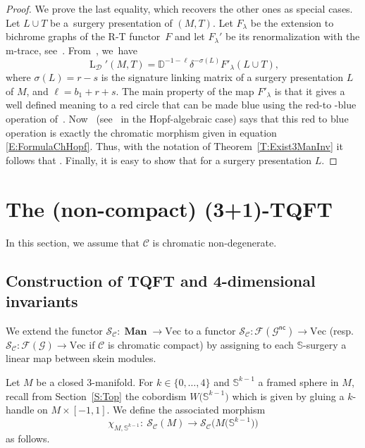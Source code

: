 \documentclass[pdftex]{sigma}
\numberwithin{equation}{section}
\numberwithin{theorem}{section}
\numberwithin{proposition}{section}
\numberwithin{definition}{section}
\numberwithin{lemma}{section}
\numberwithin{corollary}{section}
\numberwithin{remark}{section}
\numberwithin{example}{section}
\newcommand{\cat}{\mathcal{C}}
\newcommand{\catd}{\mathcal{D}}
\newcommand{\TSkein}{{\mathscr{S}}}
\newcommand{\Vect}{\mathrm{Vec}}
\newcommand{\nc}[1]{{#1^{\mathsf{nc}}}}
\newcommand{\man}{\operatorname{\textbf{Man}}}
\newcommand{\Sp}{\mathbb{S}}
\begin{document}
 \begin{proof}
We prove the last equality, which recovers the other ones as special cases. Let ${L\cup T}$ be a~surgery presentation of $(M,T)$. Let $F_\lambda$ be the extension to bichrome graphs of the R-T functor~$F$ and let $F_\lambda'$ be its renormalization with the m-trace, see~\cite{DRGGPMR2022, DRGPM18}. From~\cite[Theorem~3.8]{DRGGPMR2022}, we~have%
\[
\operatorname{L}_\catd'(M,T)= \mathbb{D}^{-1 - \ell} \delta^{- \sigma(L)} F'_{\lambda}(L\cup T),
\]
where $\sigma(L)=r-s$ is the signature linking matrix of a surgery presentation $L$ of $M$,  and $\ell=b_1+r+s$.
The main property of the map $F'_\lambda$ is that it gives a well defined meaning to a red circle that can be made blue using the red-to -blue operation of~\cite{DRGGPMR2022}.
Now~\cite{CGPV2023b} (see~\cite[Lemma 6.3]{CGPT20} in the Hopf-algebraic case) says that this red to blue operation is exactly the chromatic morphism given in equation \eqref{E:FormulaChHopf}. Thus, with the notation of Theorem~\ref{T:Exist3ManInv} it follows that .
Finally, it is easy to show that  for a surgery presentation $L$.
\end{proof}

\section{The (non-compact) (3+1)-TQFT}%
In this section, we assume that $\cat$ is
chromatic non-degenerate.

\subsection{Construction of TQFT and 4-dimensional invariants}
We extend the functor $\TSkein_\cat\colon\man\to \Vect$ to a
functor $\TSkein_\cat\colon \mathcal{F}(\nc{\mathcal{G}})\to \Vect$
(resp.~$\TSkein_\cat\colon \mathcal{F}(\mathcal{G})\to \Vect$ if
$\cat$ is chromatic compact)
by assigning to each $\Sp$-surgery a
linear map between skein modules.

Let $M$ be a closed 3-manifold. For $k\in \{0,\dots ,4\}$ and $\Sp^{k-1}$ a framed sphere in $M$, recall from Section~\ref{S:Top} the cobordism $W\bigl(\Sp^{k-1}\bigr)$ which is given by gluing a $k$-handle on $M\times [-1,1]$. We define the associated morphism
\[\chi _{M,{\Sp^{k-1}}}\colon\ \TSkein_\cat(M)\to\TSkein_\cat\bigl(M\bigl({\Sp^{k-1}}\bigr)\bigr)\]
as follows.
\end{document}
